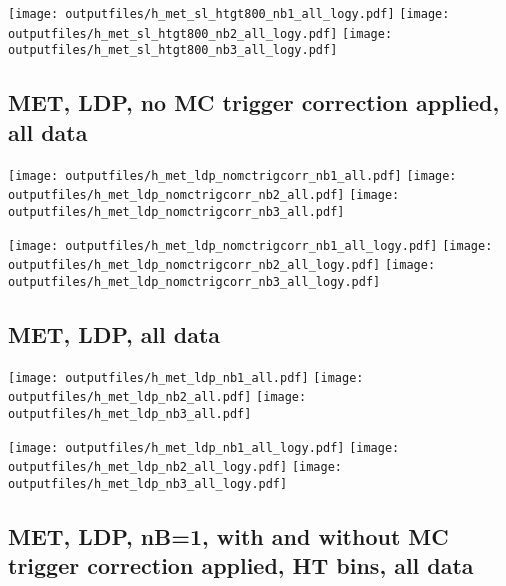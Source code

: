 \documentclass[11pt]{article}
\begin{document}
    \noindent
     \texttt{[image: outputfiles/h\_met\_sl\_htgt800\_nb1\_all\_logy.pdf]}
     \texttt{[image: outputfiles/h\_met\_sl\_htgt800\_nb2\_all\_logy.pdf]}
     \texttt{[image: outputfiles/h\_met\_sl\_htgt800\_nb3\_all\_logy.pdf]}






     \subsection{ MET, LDP, no MC trigger correction applied, all data}

    \noindent
     \texttt{[image: outputfiles/h\_met\_ldp\_nomctrigcorr\_nb1\_all.pdf]}
     \texttt{[image: outputfiles/h\_met\_ldp\_nomctrigcorr\_nb2\_all.pdf]}
     \texttt{[image: outputfiles/h\_met\_ldp\_nomctrigcorr\_nb3\_all.pdf]}

    \noindent
     \texttt{[image: outputfiles/h\_met\_ldp\_nomctrigcorr\_nb1\_all\_logy.pdf]}
     \texttt{[image: outputfiles/h\_met\_ldp\_nomctrigcorr\_nb2\_all\_logy.pdf]}
     \texttt{[image: outputfiles/h\_met\_ldp\_nomctrigcorr\_nb3\_all\_logy.pdf]}


    \subsection{ MET, LDP, all data}

    \noindent
     \texttt{[image: outputfiles/h\_met\_ldp\_nb1\_all.pdf]}
     \texttt{[image: outputfiles/h\_met\_ldp\_nb2\_all.pdf]}
     \texttt{[image: outputfiles/h\_met\_ldp\_nb3\_all.pdf]}

    \noindent
     \texttt{[image: outputfiles/h\_met\_ldp\_nb1\_all\_logy.pdf]}
     \texttt{[image: outputfiles/h\_met\_ldp\_nb2\_all\_logy.pdf]}
     \texttt{[image: outputfiles/h\_met\_ldp\_nb3\_all\_logy.pdf]}


     \subsection{ MET, LDP, nB=1, with and without MC trigger correction applied, HT bins, all data}
\end{document}
